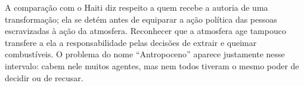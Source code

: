 A comparação com o Haiti diz respeito a quem recebe a autoria de uma transformação; ela se detém antes de equiparar a ação política das pessoas escravizadas à ação da atmosfera. Reconhecer que a atmosfera age tampouco transfere a ela a responsabilidade pelas decisões de extrair e queimar combustíveis. O problema do nome \enquote{Antropoceno} aparece justamente nesse intervalo: cabem nele muitos agentes, mas nem todos tiveram o mesmo poder de decidir ou de recusar.
